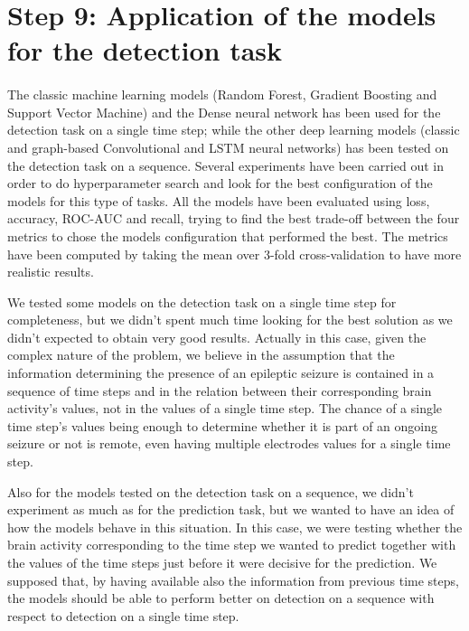 \section{Step 9: Application of the models for the detection task} \label{sec: step_models_detection_task}
\paragraph{} The classic machine learning models (Random Forest, Gradient Boosting and Support Vector Machine) and the Dense neural network has been used for the detection task on a single time step; while the other deep learning models (classic and graph-based Convolutional and LSTM neural networks) has been tested on the detection task on a sequence. Several experiments have been carried out in order to do hyperparameter search and look for the best configuration of the models for this type of tasks. All the models have been evaluated using loss, accuracy, ROC-AUC and recall, trying to find the best trade-off between the four metrics to chose the models configuration that performed the best. The metrics have been computed by taking the mean over 3-fold cross-validation to have more realistic results.

We tested some models on the detection task on a single time step for completeness, but we didn't spent much time looking for the best solution as we didn't expected to obtain very good results. Actually in this case, given the complex nature of the problem, we believe in the assumption that the information determining the presence of an epileptic seizure is contained in a sequence of time steps and in the relation between their corresponding brain activity's values, not in the values of a single time step. The chance of a single time step's values being enough to determine whether it is part of an ongoing seizure or not is remote, even having multiple electrodes values for a single time step. 

Also for the models tested on the detection task on a sequence, we didn't experiment as much as for the prediction task, but we wanted to have an idea of how the models behave in this situation. In this case, we were testing whether the brain activity corresponding to the time step we wanted to predict together with the values of the time steps just before it were decisive for the prediction. We supposed that, by having available also the information from previous time steps, the models should be able to perform better on detection on a sequence with respect to detection on a single time step.

